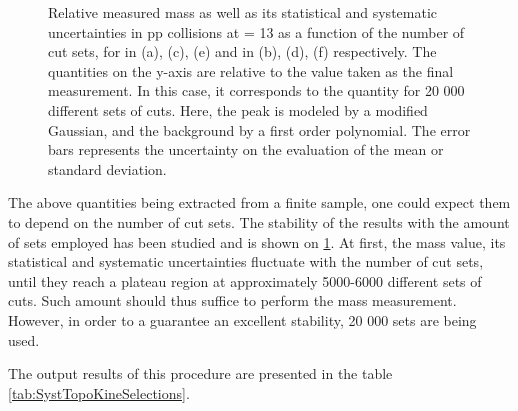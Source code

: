 \begin{figure}[!p]
\hspace*{-1.5cm}
\hspace*{-1.5cm}
\hspace*{-1.5cm}
\caption{Relative measured mass as well as its statistical and systematic uncertainties in pp collisions at \sqrtS = 13 \tev as a function of the number of cut sets, for \rmXi in (a), (c), (e) and \rmOmega in (b), (d), (f) respectively. The quantities on the y-axis are relative to the value taken as the final measurement. In this case, it corresponds to the quantity for 20 000 different sets of cuts. Here, the peak is modeled by a modified Gaussian, and the background by a first order polynomial. The error bars represents the uncertainty on the evaluation of the mean or standard deviation.}
	\label{fig:MassVsNentries}
\end{figure}

The above quantities being extracted from a finite sample, one could expect them to depend on the number of cut sets. The stability of the results with the amount of sets employed has been studied and is shown on \fig\ref{fig:MassVsNentries}. At first, the mass value, its statistical and systematic uncertainties fluctuate with the number of cut sets, until they reach a plateau region at approximately 5000-6000 different sets of cuts. Such amount should thus suffice to perform the mass measurement. However, in order to a guarantee an excellent stability, 20 000 sets are being used.

The output results of this procedure are presented in the table \ref{tab:SystTopoKineSelections}.

